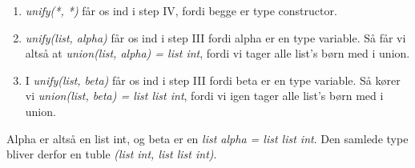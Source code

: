 \documentclass[12pt]{article}
\begin{document}
\begin{enumerate}
	\item \textit{unify(*, *)} får os ind i step IV, fordi begge er type constructor.
	\item \textit{unify(list, alpha)} får os ind i step III fordi alpha er en type variable. Så får vi altså at \textit{union(list, alpha) = list int}, fordi vi tager alle list's børn med i union.
	\item I \textit{unify(list, beta)} får os ind i step III fordi beta er en type variable. Så kører vi \textit{union(list, beta) = list list int}, fordi vi igen tager alle list's børn med i union. 
\end{enumerate}

Alpha er altså en list int, og beta er en \textit{list alpha = list list int}. Den samlede type bliver derfor en tuble \textit{(list int, list list int)}. 
\end{document}
